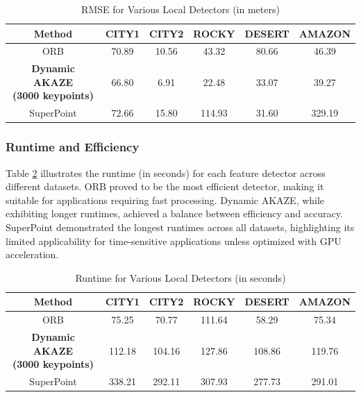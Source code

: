 \begin{table}[H]
    \centering
    \caption{RMSE for Various Local Detectors (in meters)}
    \label{tab:rmse_detectors}
    \begin{tabular}{|c|c|c|c|c|c|}
    \hline
    \textbf{Method} & \textbf{CITY1} & \textbf{CITY2} & \textbf{ROCKY} & \textbf{DESERT} & \textbf{AMAZON} \\ \hline
    ORB & 70.89 & 10.56 & 43.32 & 80.66 & 46.39 \\ \hline
    \makecell{\textbf{Dynamic AKAZE} \\ \textbf{(3000 keypoints)}} & 66.80 & 6.91 & 22.48 & 33.07 & 39.27 \\ \hline
    SuperPoint & 72.66 & 15.80 & 114.93 & 31.60 & 329.19 \\ \hline
    \end{tabular}
\end{table}

\subsubsection*{Runtime and Efficiency}

Table \ref{tab:runtime_detectors} illustrates the runtime (in seconds) for each feature detector across different datasets. ORB proved to be the most efficient detector, making it suitable for applications requiring fast processing. Dynamic AKAZE, while exhibiting longer runtimes, achieved a balance between efficiency and accuracy. SuperPoint demonstrated the longest runtimes across all datasets, highlighting its limited applicability for time-sensitive applications unless optimized with GPU acceleration.

\begin{table}[H]
    \centering
    \caption{Runtime for Various Local Detectors (in seconds)}
    \label{tab:runtime_detectors}
    \begin{tabular}{|c|c|c|c|c|c|}
    \hline
    \textbf{Method} & \textbf{CITY1} & \textbf{CITY2} & \textbf{ROCKY} & \textbf{DESERT} & \textbf{AMAZON} \\ \hline
    ORB & 75.25 & 70.77 & 111.64 & 58.29 & 75.34 \\ \hline
    \makecell{\textbf{Dynamic AKAZE} \\ \textbf{(3000 keypoints)}} & 112.18 & 104.16 & 127.86 & 108.86 & 119.76 \\ \hline
    SuperPoint & 338.21 & 292.11 & 307.93 & 277.73 & 291.01 \\ \hline
    \end{tabular}
\end{table}

